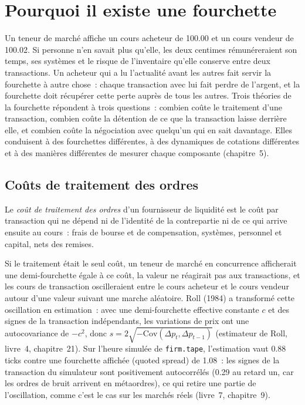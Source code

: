 \chapter{Pourquoi il existe une fourchette}\label{ch:mx:why-there-is-a-spread}

Un teneur de marché affiche un cours acheteur de 100.00 et un cours vendeur de 100.02. Si personne n'en savait plus qu'elle, les deux centimes rémunéreraient son temps, ses systèmes et le
risque de l'inventaire qu'elle conserve entre deux transactions. Un acheteur qui a lu l'actualité avant les autres fait servir la fourchette à autre chose~: chaque transaction
avec lui fait perdre de l'argent, et la fourchette doit récupérer cette perte auprès de tous les autres. Trois théories de la fourchette répondent à trois questions~: combien
coûte le traitement d'une transaction, combien coûte la détention de ce que la transaction laisse derrière elle, et combien coûte la négociation avec quelqu'un qui en sait davantage. Elles conduisent
à des fourchettes différentes, à des dynamiques de cotations différentes et à des manières différentes de mesurer chaque composante (chapitre~5).

\section{Coûts de traitement des ordres}

\begin{definition}\label{def:mx:why-there-is-a-spread:processing}
Le \emph{coût de traitement des ordres} d'un fournisseur de liquidité est le coût par transaction qui ne dépend ni de
l'identité de la contrepartie ni de ce qui arrive ensuite au cours~: frais de bourse et de compensation, systèmes, personnel et capital, nets des remises.
\end{definition}

Si le traitement était le seul coût, un teneur de marché en concurrence afficherait une demi-fourchette égale à ce coût, la valeur ne réagirait pas aux transactions, et
les cours de transaction oscilleraient entre le cours acheteur et le cours vendeur autour d'une valeur suivant une marche aléatoire. Roll (1984) a transformé cette oscillation en estimation~: avec une
demi-fourchette effective constante $c$ et des signes de la transaction indépendants, les variations de prix ont une autocovariance de $-c^2$, donc $s = 2\sqrt{-\mathrm{Cov}(\Delta p_t,\Delta
p_{t-1})}$ (estimateur de Roll, livre~4, chapitre~21). Sur l'heure simulée de \texttt{firm.tape}, l'estimation vaut 0.88 ticks contre une fourchette affichée
(quoted spread) de 1.08~: les signes de la transaction du simulateur sont positivement autocorrélés (0.29 au retard un, car les ordres de bruit arrivent en métaordres), ce qui retire
une partie de l'oscillation, comme c'est le cas sur les marchés réels (livre~7, chapitre~9).

